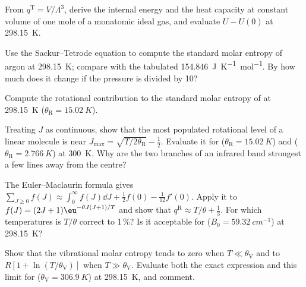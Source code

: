 \begin{exercise}[$\star\star$]\label{exo:b3:partition-functions:7}
From $q^{\mathrm T} = V/\Lambda^3$, derive the internal energy and the heat capacity at
constant volume of one mole of a monatomic ideal gas, and evaluate $U - U(0)$ at
\qty{298.15}{K}.
\end{exercise}

\begin{exercise}[$\star\star$]\label{exo:b3:partition-functions:8}
Use the Sackur--Tetrode equation to compute the standard molar entropy of
argon at \qty{298.15}{K}; compare with the tabulated
\qty{154.846}{J.K^{-1}.mol^{-1}}. By how much does it change if the pressure is divided by 10?
\end{exercise}

\begin{exercise}[$\star\star$]\label{exo:b3:partition-functions:9}
Compute the rotational contribution to the standard molar entropy of
 at \qty{298.15}{K} ($\theta_{\mathrm R} = \qty{15.02}{K}$).
\end{exercise}

\begin{exercise}[$\star\star\star$]\label{exo:b3:partition-functions:10}
Treating $J$ as continuous, show that the most populated rotational level of a
linear molecule is near $J_{\max} = \sqrt{T/2\theta_{\mathrm R}} - \frac12$. Evaluate it for 
($\theta_{\mathrm R} = \qty{15.02}{K}$) and  ($\theta_{\mathrm R} = \qty{2.766}{K}$) at \qty{300}{K}. Why are the two
branches of an infrared band strongest a few lines away from the centre?
\end{exercise}

\begin{exercise}[$\star\star\star$]\label{exo:b3:partition-functions:11}
The Euler--Maclaurin formula gives $\sum_{J\ge0}f(J) \approx \int_0^\infty f(J)\dd J + \frac12f(0) -
\frac1{12}f'(0)$. Apply it to $f(J) = (2J+1)\eu^{-\theta J(J+1)/T}$ and show that $q^{\mathrm R} \approx T/\theta +
\frac13$. For which temperatures is $T/\theta$ correct to 1\,\%? Is it acceptable for 
($B_0 = \qty{59.32}{cm^{-1}}$) at \qty{298.15}{K}?
\end{exercise}

\begin{exercise}[$\star\star\star$]\label{exo:b3:partition-functions:12}
Show that the vibrational molar entropy tends to zero when $T \ll \theta_{\mathrm V}$ and to
$R[1 + \ln(T/\theta_{\mathrm V})]$ when $T \gg \theta_{\mathrm V}$. Evaluate both the exact expression and this
limit for  ($\theta_{\mathrm V} = \qty{306.9}{K}$) at \qty{298.15}{K}, and comment.
\end{exercise}

